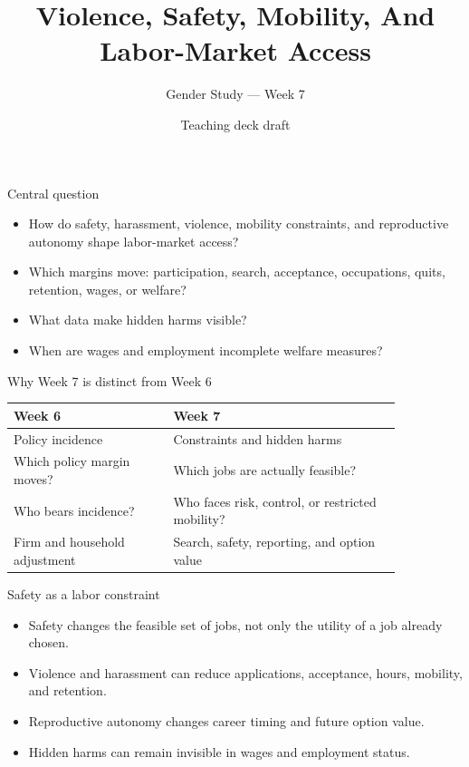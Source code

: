 \documentclass[aspectratio=169,11pt]{beamer}
\title{Violence, Safety, Mobility, And Labor-Market Access}
\subtitle{Gender Study --- Week 7}
\author{Teaching deck draft}
\date{}
\begin{document}
\begin{frame}
  \titlepage
\end{frame}

\begin{frame}{Central question}
\begin{itemize}
    \item How do safety, harassment, violence, mobility constraints, and reproductive autonomy shape labor-market access?
    \item Which margins move: participation, search, acceptance, occupations, quits, retention, wages, or welfare?
    \item What data make hidden harms visible?
    \item When are wages and employment incomplete welfare measures?
\end{itemize}
\end{frame}

\begin{frame}{Why Week 7 is distinct from Week 6}
\begin{tabular}{p{0.35\linewidth} p{0.50\linewidth}}
\toprule
Week 6 & Week 7 \\
\midrule
Policy incidence & Constraints and hidden harms \\
Which policy margin moves? & Which jobs are actually feasible? \\
Who bears incidence? & Who faces risk, control, or restricted mobility? \\
Firm and household adjustment & Search, safety, reporting, and option value \\
\bottomrule
\end{tabular}
\end{frame}

\begin{frame}{Safety as a labor constraint}
\begin{itemize}
    \item Safety changes the feasible set of jobs, not only the utility of a job already chosen.
    \item Violence and harassment can reduce applications, acceptance, hours, mobility, and retention.
    \item Reproductive autonomy changes career timing and future option value.
    \item Hidden harms can remain invisible in wages and employment status.
\end{itemize}
\end{frame}
\end{document}
